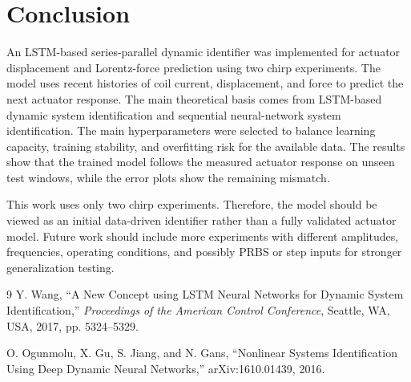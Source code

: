 \documentclass[11pt]{article}
\begin{document}
\section{Conclusion}
An LSTM-based series-parallel dynamic identifier was implemented for actuator displacement and Lorentz-force prediction using two chirp experiments. The model uses recent histories of coil current, displacement, and force to predict the next actuator response. The main theoretical basis comes from LSTM-based dynamic system identification and sequential neural-network system identification. The main hyperparameters were selected to balance learning capacity, training stability, and overfitting risk for the available data. The results show that the trained model follows the measured actuator response on unseen test windows, while the error plots show the remaining mismatch.

This work uses only two chirp experiments. Therefore, the model should be viewed as an initial data-driven identifier rather than a fully validated actuator model. Future work should include more experiments with different amplitudes, frequencies, operating conditions, and possibly PRBS or step inputs for stronger generalization testing.

\begin{thebibliography}{9}
Y. Wang, ``A New Concept using LSTM Neural Networks for Dynamic System Identification,'' \textit{Proceedings of the American Control Conference}, Seattle, WA, USA, 2017, pp. 5324--5329.

O. Ogunmolu, X. Gu, S. Jiang, and N. Gans, ``Nonlinear Systems Identification Using Deep Dynamic Neural Networks,'' arXiv:1610.01439, 2016.
\end{thebibliography}
\end{document}
